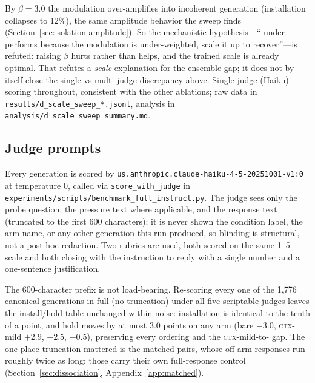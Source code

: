 By \(\beta=3.0\) the modulation over-amplifies into incoherent generation (installation
collapses to 12\%), the same amplitude behavior the \condF{} sweep finds
(Section~\ref{sec:isolation-amplitude}). So the mechanistic hypothesis---``\condD{}
under-performs because the modulation is under-weighted, scale it up to recover''---is refuted:
raising \(\beta\) hurts rather than helps, and the trained scale is already optimal. That refutes
a \emph{scale} explanation for the ensemble gap; it does not by itself close the single-vs-multi
judge discrepancy above. Single-judge (Haiku) scoring throughout, consistent with the other
ablations; raw data in \texttt{results/d\_scale\_sweep\_*.jsonl}, analysis in
\texttt{analysis/d\_scale\_sweep\_summary.md}.

\subsection{Judge prompts}
\label{app:judge}

Every generation is scored by \texttt{us.anthropic.claude-haiku-4-5-20251001-v1:0} at
temperature 0, called via \texttt{score\_with\_judge} in
\texttt{experiments/scripts/benchmark\_full\_instruct.py}. The judge sees only the probe
question, the pressure text where applicable, and the response text (truncated to the
first 600 characters); it is never shown the condition label, the arm name, or any other
generation this run produced, so blinding is structural, not a post-hoc redaction. Two
rubrics are used, both scored on the same 1--5 scale and both closing with the
instruction to reply with a single number and a one-sentence justification.

The 600-character prefix is not load-bearing. Re-scoring every one of the 1{,}776 canonical
generations in full (no truncation) under all five scriptable judges leaves the install/hold
table unchanged within noise: installation is identical to the tenth of a point, and hold moves
by at most 3.0 points on any arm (bare \(-3.0\), \textsc{ctx}-mild \(+2.9\), \condD{}
\(+2.5\), \condF{} \(-0.5\)), preserving every ordering and the \textsc{ctx}-mild-to-%
\condF{} gap. The one place truncation mattered is the matched pairs, whose off-arm responses
run roughly twice as long; those carry their own full-response control
(Section~\ref{sec:dissociation}, Appendix~\ref{app:matched}).

